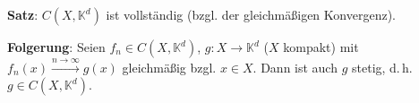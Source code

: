 \textbf{Satz}: $C(X, \mathbb{K}^d)$ ist vollständig
(bzgl. der gleichmäßigen Konvergenz).

\textbf{Folgerung}: Seien $f_n \in C(X, \mathbb{K}^d)$,
$g: X \rightarrow \mathbb{K}^d$ ($X$ kompakt) mit
$f_n(x) \xrightarrow{n \to \infty} g(x)$ gleichmäßig bzgl. $x \in X$.
Dann ist auch $g$ stetig, d.\,h. $g \in C(X, \mathbb{K}^d)$.

\pagebreak

